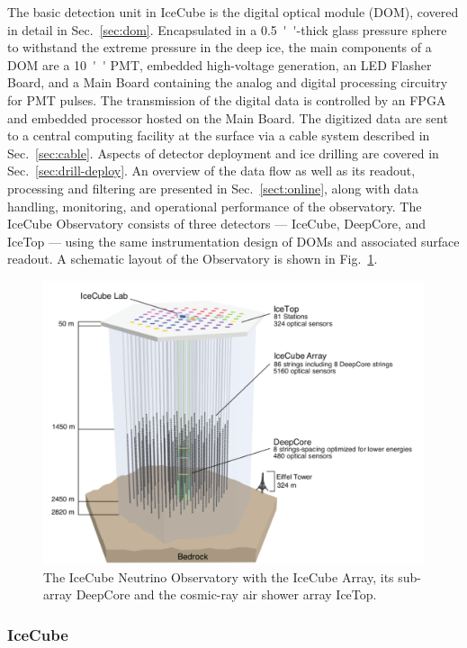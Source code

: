 The basic detection unit in IceCube is the
digital optical module (DOM), covered in detail in Sec.~\ref{sec:dom}.
Encapsulated in a \SI{0.5}{''}-thick glass pressure sphere 
to withstand the extreme pressure in the deep ice, the main components of a DOM
are a \SI{10}{''} PMT, embedded high-voltage generation, an LED Flasher 
Board, and a Main Board containing the analog and digital processing circuitry
for PMT pulses.  The transmission of the digital data is controlled by an FPGA
and embedded processor hosted on the Main Board. The digitized data are sent to a
central computing facility at the surface via a cable system described in
Sec.~\ref{sec:cable}.  Aspects of detector deployment and ice drilling are
covered in Sec.~\ref{sec:drill-deploy}. An overview of the data flow as well as
its readout, processing and filtering are presented in
Sec.~\ref{sect:online}, along with data handling, monitoring, and operational performance of
the observatory. The IceCube Observatory consists of three detectors ---
IceCube, DeepCore, and IceTop --- using the same instrumentation design of
DOMs and associated surface readout. A schematic layout of the Observatory is
shown in Fig.~\ref{fig:array}. 

\begin{figure}[!h]
 \centering
 \includegraphics[width=\textwidth]{graphics/intro/ArrayWSeasonsLabels_crop.pdf}
 \caption{The IceCube Neutrino Observatory with the IceCube Array, its sub-array DeepCore and
   the cosmic-ray air shower array IceTop.}
 \label{fig:array}
\end{figure}

\subsubsection{IceCube}

